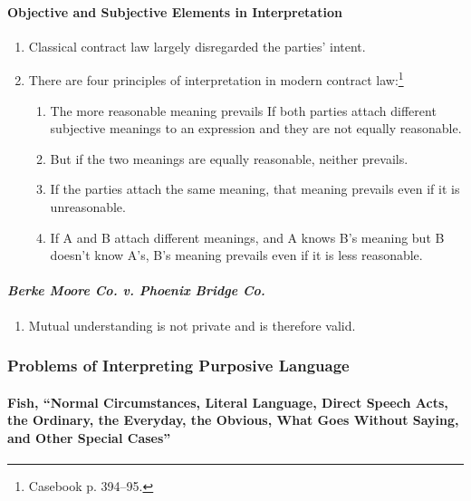 \paragraph{Objective and Subjective Elements in Interpretation}

\begin{enumerate}
    \item Classical contract law largely disregarded the parties' intent.
    \item There are four principles of interpretation in modern contract 
    law:\footnote{Casebook p. 394--95.}
    \begin{enumerate}
        \item The more reasonable meaning prevails If both parties attach 
        different subjective meanings to an expression  and they 
        are not equally reasonable.
        \item But if the two meanings are equally reasonable, neither 
        prevails.
        \item If the parties attach the same meaning, that meaning prevails 
        even if it is unreasonable.
        \item If A and B attach different meanings, and A knows B's meaning 
        but B doesn't know A's, B's meaning prevails even if it is less 
        reasonable.
    \end{enumerate}
\end{enumerate}

\paragraph{\emph{Berke Moore Co. v. Phoenix Bridge Co.}}

\begin{enumerate}
    \item Mutual understanding is not private and is therefore valid.
\end{enumerate}

\subsubsection{Problems of Interpreting Purposive Language}

\paragraph{Fish, ``Normal Circumstances, Literal Language, Direct Speech 
Acts, the Ordinary, the Everyday, the Obvious, What Goes Without Saying, and 
Other Special Cases''}

